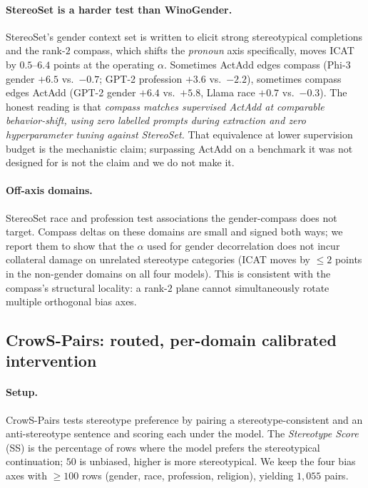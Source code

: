 \paragraph{StereoSet is a harder test than WinoGender.} StereoSet's
gender context set is written to elicit strong stereotypical completions
and the rank-$2$ compass, which shifts the \emph{pronoun} axis
specifically, moves ICAT by $0.5$--$6.4$ points at the operating $\alpha$.
Sometimes ActAdd edges compass (Phi-3 gender $+6.5$ vs.\ $-0.7$; GPT-2
profession $+3.6$ vs.\ $-2.2$), sometimes compass edges ActAdd (GPT-2
gender $+6.4$ vs.\ $+5.8$, Llama race $+0.7$ vs.\ $-0.3$). The honest
reading is that \emph{compass matches supervised ActAdd at comparable
behavior-shift, using zero labelled prompts during extraction and zero
hyperparameter tuning against StereoSet.} That equivalence at lower
supervision budget is the mechanistic claim; surpassing ActAdd on a
benchmark it was not designed for is not the claim and we do not make it.

\paragraph{Off-axis domains.} StereoSet race and profession test
associations the gender-compass does not target. Compass deltas on
these domains are small and signed both ways; we report them to show
that the $\alpha$ used for gender decorrelation does not incur
collateral damage on unrelated stereotype categories (ICAT moves by
$\le 2$ points in the non-gender domains on all four models). This
is consistent with the compass's structural locality: a rank-$2$
plane cannot simultaneously rotate multiple orthogonal bias axes.

\subsection{CrowS-Pairs: routed, per-domain calibrated intervention}
\label{sec:crowspairs}

\paragraph{Setup.} CrowS-Pairs \citep{nangia2020crowspairs}
tests stereotype preference by pairing a stereotype-consistent and an
anti-stereotype sentence and scoring each under the model. The
\emph{Stereotype Score} (SS) is the percentage of rows where the model
prefers the stereotypical continuation; $50$ is unbiased, higher is
more stereotypical. We keep the four bias axes with $\geq 100$ rows
(gender, race, profession, religion), yielding $1{,}055$ pairs.

